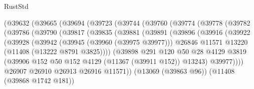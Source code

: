 \begin{lexlean}{RustStd}
\begin{coremodule}
                  (@39632
                    (@39665
                      (@39694
                        (@39723
                          (@39744
                            (@39760
                              (@39774
                                (@39778
                                  (@39782
                                    (@39786
                                      (@39790
                                        (@39817
                                          (@39835
                                            (@39881
                                              (@39891
                                                (@39896
                                                  (@39916
                                                    (@39922
                                                      (@39928
                                                        (@39942
                                                          (@39945 (@39960 (@39975 @39977)))
                                                          @26846
                                                          @11571
                                                          @13220
                                                          (@11408 (@13222 @8791 @3825))))
                                                      (@39898
                                                        @291
                                                        @120
                                                        @50
                                                        @28
                                                        @4129
                                                        @3819
                                                        (@39906
                                                          @152
                                                          @50
                                                          @152
                                                          @4129
                                                          (@11367 (@39911 @152))
                                                          @13243)
                                                        @39977))))
                                                @26907
                                                @26910
                                                @26913
                                                @26916
                                                @11571))
                                            (@13069 (@39863 @96))
                                            (@11408 (@39868 @1742 @181))

\end{coremodule}
\end{lexlean}
